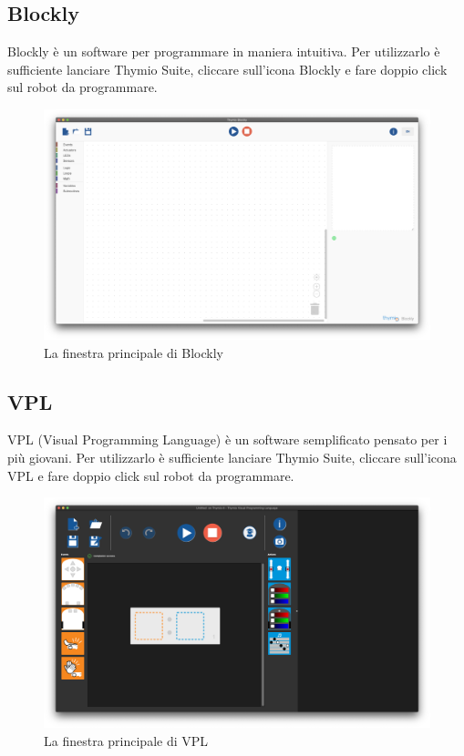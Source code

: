 \documentclass[12pt]{article}
\begin{document}
	\newpage

	\subsection{Blockly}

		Blockly è un software per programmare in maniera intuitiva. Per utilizzarlo è sufficiente lanciare Thymio Suite, cliccare sull'icona Blockly e fare doppio click sul robot da programmare.
		
		\begin{figure}[H]
			\includegraphics[width=\textwidth]{img/blockly.png}
			\caption{La finestra principale di Blockly}
			\label{main_blockly}
		\end{figure}
		
	\newpage
		
	\subsection{VPL}
	
		VPL (Visual Programming Language) è un software semplificato pensato per i più giovani. Per utilizzarlo è sufficiente lanciare Thymio Suite, cliccare sull'icona VPL e fare doppio click sul robot da programmare.
		
		\begin{figure}[H]
			\includegraphics[width=\textwidth]{img/vpl.png}
			\caption{La finestra principale di VPL}
			\label{main_vpl}
		\end{figure}
		
\end{document}
